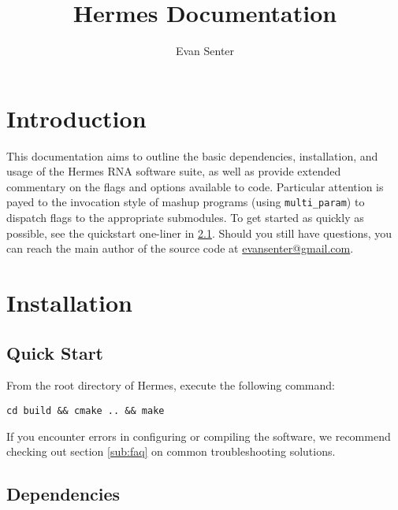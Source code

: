 \documentclass[11pt]{article}
\begin{document}
\newcommand{\sectionLabel}[2] {
  \section{#1}
  \label{sec:#2}
}
\newcommand{\subsectionLabel}[2] {
  \subsection{#1}
  \label{sub:#2}
}
\newcommand{\fixedWidthInList}[4] {
	\item[\texttt{#1} \textnormal{#2} \url{#3}] \hfill \\
	#4
}
\newcommand{\hermes}{{\tt hermes}}
\newcommand{\multiParam}{{\tt multi\_param}}
\newcommand{\fft}{{\tt FFTbor2D}}
\newcommand{\rnamfpt}{{\tt RNAmfpt}}
\newcommand{\rnaeq}{{\tt RNAeq}}
\newcommand{\fftmfpt}{{\tt FFTmfpt}}
\newcommand{\ffteq}{{\tt FFTeq}}
\newcommand{\rateeq}{{\tt RateEq}}

\title{Hermes Documentation}
\author{Evan Senter}

\maketitle
\tableofcontents
\clearpage

\sectionLabel{Introduction}{intro}

This documentation aims to outline the basic dependencies, installation, and usage of the Hermes RNA software suite, as well as provide extended commentary on the flags and options available to code. Particular attention is payed to the invocation style of mashup programs (using \multiParam) to dispatch flags to the appropriate submodules. To get started as quickly as possible, see the quickstart one-liner in \ref{sub:quickstart}. Should you still have questions, you can reach the main author of the source code at \href{mailto:evansenter@gmail.com}{evansenter@gmail.com}.

\sectionLabel{Installation}{install}

\subsectionLabel{Quick Start}{quickstart}

From the root directory of Hermes, execute the following command:

{\tt cd build \&\& cmake .. \&\& make}

If you encounter errors in configuring or compiling the software, we recommend checking out section \ref{sub:faq} on common troubleshooting solutions.

\subsectionLabel{Dependencies}{dependencies}
\end{document}
